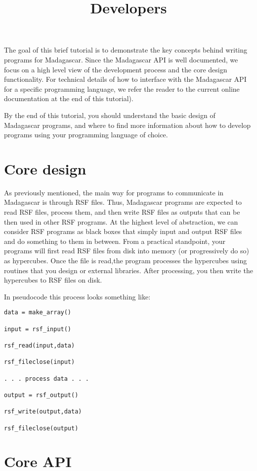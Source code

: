 \title{Developers}

The goal of this brief tutorial is to demonstrate the key concepts behind writing programs for Madagascar.  Since the Madagascar API is well documented, we focus on a high level view of the development process and the core design functionality.  For technical details of how to interface with the Madagascar API for a specific programming language, we refer the reader to the current online documentation at the end of this tutorial).

By the end of this tutorial, you should understand the basic design of Madagascar programs, and where to find more information about how to develop programs using your programming language of choice.

\section{Core design}

As previously mentioned, the main way for programs to communicate in Madagascar is through RSF files.  Thus, Madagascar programs are expected to read RSF files, process them, and then write RSF files as outputs that can be then used in other RSF programs.  At the highest level of abstraction, we can consider RSF programs as black boxes that simply input and output RSF files and do something to them in between.
From a practical standpoint, your programs will first read RSF files from disk into memory (or progressively do so) as hypercubes.  Once the file is read,the program processes the hypercubes using routines that you design or external libraries.  After processing, you then write the hypercubes to RSF files on disk.  

In pseudocode this process looks something like:
\begin{verbatim}
data = make_array()

input = rsf_input()

rsf_read(input,data) 

rsf_fileclose(input)

. . . process data . . .

output = rsf_output()

rsf_write(output,data)

rsf_fileclose(output)
\end{verbatim}

\section{Core API}

